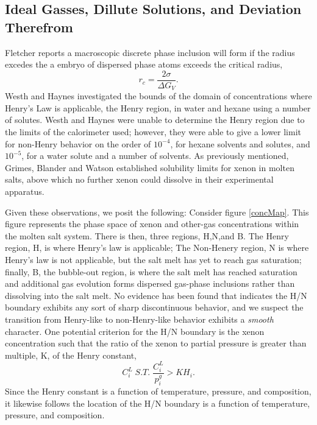 \subsection{Ideal Gasses, Dillute Solutions, and Deviation Therefrom}
Fletcher reports a macroscopic discrete phase inclusion will form if the radius excedes the a embryo of dispersed phase atoms exceeds the critical radius,
\begin{equation}
    r_c = \frac{2\sigma}{\Delta G_V}.
\end{equation}\cite{Fletcher1958}
Westh and Haynes investigated the bounds of the domain of concentrations where Henry's Law is applicable,  the Henry region, in water and hexane using a number of solutes. \cite{Westh1998} Westh and Haynes were unable to determine the Henry region due to the limits of the calorimeter used; however, they were able to give a lower limit for non-Henry behavior on the order of $10^{-4}$, for hexane solvents and solutes, and $10^{-5}$, for a water solute and a number of solvents.   As previously mentioned, Grimes, Blander and Watson established solubility limits for xenon in molten salts, above which no further xenon could dissolve in their experimental apparatus. \cite{Grimes1958,Blander1959,Watson1962}

Given these observations, we posit the following: Consider figure \ref{concMap}.  This figure represents the phase space of xenon and other-gas concentrations within the molten salt system.  There is then, three regions, H,N,and B.  The Henry region, H, is where Henry's law is applicable; The Non-Henery region, N is where Henry's law is not applicable, but the salt melt has yet to reach gas saturation; finally, B, the bubble-out region, is where the salt melt has reached saturation and additional gas evolution forms dispersed gas-phase inclusions rather than dissolving into the salt melt.  No evidence has been found that indicates the H/N boundary exhibits any sort of sharp discontinuous behavior, and we suspect the transition from Henry-like to non-Henry-like behavior exhibits a \textit{smooth} character.  One potential criterion for the H/N boundary is the xenon concentration such that the ratio of the xenon to partial pressure is greater than multiple, K, of the Henry constant,
\begin{equation}
    C_i^L \; S.T. \; \frac{C_i^L}{p_i^g} > KH_i.
\end{equation}
Since the Henry constant is a function of temperature, pressure, and composition, it likewise follows the location of the  H/N boundary is a function of temperature, pressure, and composition. 
